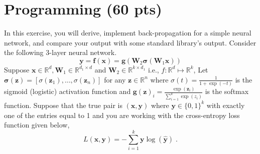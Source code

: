 \documentclass[a4paper]{article}
\theoremstyle{definition}
\renewcommand\vec[1]{\boldsymbol{#1}}
\def\R{\mathbb R}
\begin{document}
\section{Programming (60 pts)}
In this exercise, you will derive, implement back-propagation for a simple neural network, and compare your output with some standard library’s output. Consider the following 3-layer neural network. 
\[\vec y = \vec f(\vec x) = \vec g(\vec W_2 \vec \sigma (\vec W_1 \vec x))\] 
Suppose $\vec x \in \R^d,\vec W_1 \in \R^{d_1\times d}$ and $\vec W_2 \in \R^{k\times d_1}$ i.e., $f : \R^d\mapsto \R^k$, Let $\vec \sigma (\vec z) = [\sigma(\vec z_1), \ldots , \sigma(\vec z_n)]$ for any $\vec z\in \R^n$ where $\sigma(t)=\frac{1}{1+\exp(-t)}$ is the sigmoid (logistic) activation function and $\vec g(\vec z)_i = \frac{\exp(\vec z_i)}{\sum_{i=1}^k  \exp(z_i)}$ is the softmax
function. Suppose that the true pair is $(\vec x, \vec y)$ where $\vec y \in \{0, 1\}^k$ with exactly one of the entries equal to 1 and you are working with the cross-entropy loss function given below, 
\[
L(\vec x,\vec y) = -\sum_{i=1}^k 
\vec y \log (\hat{\vec y})\;. 
\]
\end{document}
